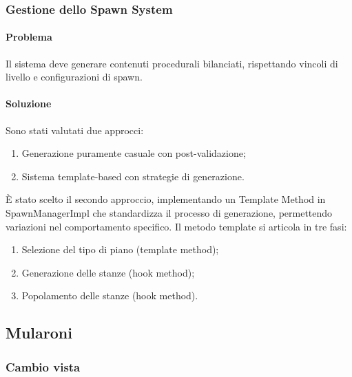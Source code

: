 \documentclass[a4paper,12pt]{report}
\begin{document}
\subsubsection{Gestione dello Spawn System}

\paragraph{Problema} Il sistema deve generare contenuti procedurali bilanciati, rispettando vincoli di livello e configurazioni di spawn.

\paragraph{Soluzione} Sono stati valutati due approcci:
\begin{enumerate}
	\item Generazione puramente casuale con post-validazione;
	\item Sistema template-based con strategie di generazione.
\end{enumerate}
È stato scelto il secondo approccio, implementando un Template Method in SpawnManagerImpl che standardizza il processo di generazione, permettendo variazioni nel comportamento specifico. Il metodo template si articola in tre fasi:
\begin{enumerate}
	\item Selezione del tipo di piano (template method);
	\item Generazione delle stanze (hook method);
	\item Popolamento delle stanze (hook method).
\end{enumerate}

\subsection{Mularoni}

\subsubsection{Cambio vista}
\end{document}
